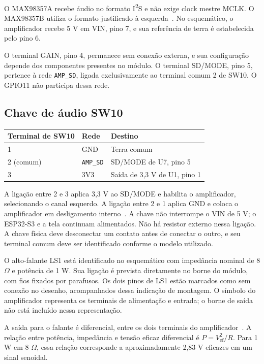 \documentclass[12pt,a4paper]{article}
\begin{document}
O MAX98357A recebe áudio no formato I\textsuperscript{2}S e não exige clock mestre MCLK. O MAX98357B utiliza o formato justificado à esquerda~\cite{max}. No esquemático, o amplificador recebe 5 V em VIN, pino 7, e sua referência de terra é estabelecida pelo pino 6.

O terminal GAIN, pino 4, permanece sem conexão externa, e sua configuração depende dos componentes presentes no módulo. O terminal SD/MODE, pino 5, pertence à rede \texttt{AMP\_SD}, ligada exclusivamente ao terminal comum 2 de SW10. O GPIO11 não participa dessa rede.

\subsection{Chave de áudio SW10}
\begin{center}
  \begin{tabular}{lll}
    \toprule
    \textbf{Terminal de SW10} & \textbf{Rede} & \textbf{Destino}\\
    \midrule
    1 & GND & Terra comum\\
    2 (comum) & \texttt{AMP\_SD} & SD/MODE de U7, pino 5\\
    3 & 3V3 & Saída de 3,3 V de U1, pino 1\\
    \bottomrule
  \end{tabular}
\end{center}
A ligação entre 2 e 3 aplica 3,3 V ao SD/MODE e habilita o amplificador, selecionando o canal esquerdo. A ligação entre 2 e 1 aplica GND e coloca o amplificador em desligamento interno~\cite{max}. A chave não interrompe o VIN de 5 V; o ESP32-S3 e a tela continuam alimentados. Não há resistor externo nessa ligação. A chave física deve desconectar um contato antes de conectar o outro, e seu terminal comum deve ser identificado conforme o modelo utilizado.

O alto-falante LS1 está identificado no esquemático com impedância nominal de 8 $\Omega$ e potência de 1 W. Sua ligação é prevista diretamente no borne do módulo, com fios fixados por parafusos. Os dois pinos de LS1 estão marcados como sem conexão no desenho, acompanhados dessa indicação de montagem. O símbolo do amplificador representa os terminais de alimentação e entrada; o borne de saída não está incluído nessa representação.

A saída para o falante é diferencial, entre os dois terminais do amplificador~\cite{max}. A relação entre potência, impedância e tensão eficaz diferencial é $P=V_{\mathrm{ef}}^2/R$. Para 1 W em 8 $\Omega$, essa relação corresponde a aproximadamente 2,83 V eficazes em um sinal senoidal.
\end{document}
